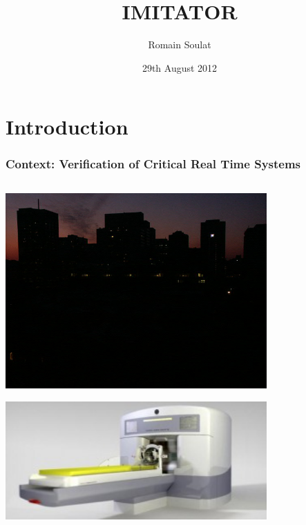 \documentclass[professionalfont]{beamer}
\title{IMITATOR}
\author{Romain Soulat}
\institute{LSV}
\date{29th August 2012}
\begin{document}
\begin{frame}
	\titlepage
\end{frame}
\section*{Introduction}
\begin{frame}
\frametitle{Context: Verification of Critical Real Time Systems}


\begin{columns}
	\begin{column}[c]{0.45 \textwidth}

		{
		\centering
		\includegraphics[width=0.75\textwidth]{figures/blackout.jpg}

		\bigskip

		\includegraphics[width=0.75\textwidth]{figures/therac.jpg}
		
}
\end{column}
\end{columns}
\end{frame}
\end{document}
